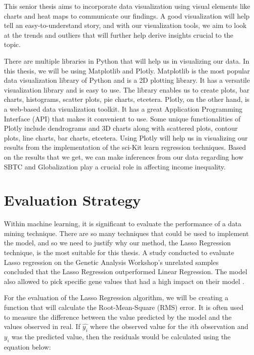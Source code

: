 \documentclass[12pt,oneside]{book} %
\begin{document}
\hspace{20pt}This senior thesis aims to incorporate data visualization using visual elements like charts and heat maps to communicate our findings. A good visualization will help tell an easy-to-understand story, and with our visualization tools, we aim to look at the trends and outliers that will further help derive insights crucial to the topic.

There are multiple libraries in Python that will help us in visualizing our data. In this thesis, we will be using Matplotlib and Plotly. Matplotlib is the most popular data visualization library of Python and is a 2D plotting library. It has a versatile visualization library and is easy to use. The library enables us to create plots, bar charts, histograms, scatter plots, pie charts, etcetera. Plotly, on the other hand, is a web-based data visualization toolkit. It has a great Application Programming Interface (API) that makes it convenient to use. Some unique functionalities of Plotly include dendrograms and 3D charts along with scattered plots, contour plots, line charts, bar charts, etcetera. Using Plotly will help us in visualizing our results from the implementation of the sci-Kit learn regression techniques. Based on the results that we get, we can make inferences from our data regarding how SBTC and Globalization play a crucial role in affecting income inequality.

\section{Evaluation Strategy}
\label{sec:evaluate}

\hspace{20pt}Within machine learning, it is significant to evaluate the performance of a data mining technique. There are so many techniques that could be used to implement the model, and so we need to justify why our method, the Lasso Regression technique, is the most suitable for this thesis. A study conducted to evaluate Lasso regression on the Genetic Analysis Workshop's unrelated samples concluded that the Lasso Regression outperformed Linear Regression. The model also allowed to pick specific gene values that had a high impact on their model \cite{guo2011evaluation}.

For the evaluation of the Lasso Regression algorithm, we will be creating a function that will calculate the Root-Mean-Square (RMS) error. It is often used to measure the difference between the value predicted by the model and the values observed in real. If $\hat{y_{i}}$ where the observed value for the $i$th observation and $y_i$ was the predicted value, then the residuals would be calculated using the equation below:
\end{document}
